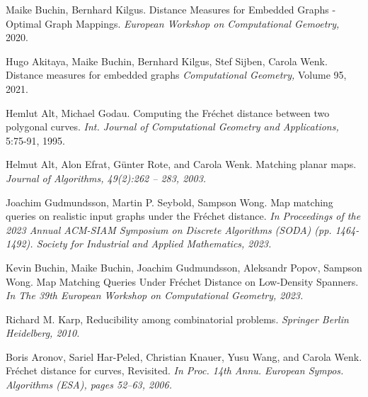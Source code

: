 \documentclass[a4paper, 12pt, twoside]{article}
\theoremstyle{Format1} %
\begin{document}
\begin{thebibliography}{3}
		Maike Buchin, Bernhard Kilgus. Distance Measures for Embedded Graphs - Optimal Graph Mappings.
		\textit{European Workshop on Computational Gemoetry,} 2020.

		Hugo Akitaya, Maike Buchin, Bernhard Kilgus, Stef Sijben, Carola Wenk. Distance measures for embedded graphs
		\textit{Computational Geometry,} Volume 95, 2021.

		Hemlut Alt, Michael Godau. Computing the Fréchet distance between two polygonal curves.
		\textit{Int. Journal of Computational Geometry and Applications,} 5:75-91, 1995.

		Helmut Alt, Alon Efrat, Günter Rote, and Carola Wenk. Matching planar maps.
		\textit{Journal of Algorithms, 49(2):262 – 283, 2003.}

		Joachim Gudmundsson, Martin P. Seybold, Sampson Wong. Map matching queries on realistic input graphs under the Fréchet distance.
		\textit{In Proceedings of the 2023 Annual ACM-SIAM Symposium on Discrete Algorithms (SODA) (pp. 1464-1492). Society for Industrial and Applied Mathematics, 2023.}

		Kevin Buchin, Maike Buchin, Joachim Gudmundsson, Aleksandr Popov, Sampson Wong. Map Matching Queries Under Fréchet Distance on Low-Density Spanners.
		\textit{In The 39th European Workshop on Computational Geometry, 2023.}

		Richard M. Karp, Reducibility among combinatorial problems.
		\textit{Springer Berlin Heidelberg, 2010.}

		Boris Aronov, Sariel Har-Peled, Christian Knauer, Yusu Wang, and Carola Wenk. Fréchet distance for curves, Revisited.
		\textit{In Proc. 14th Annu. European Sympos. Algorithms (ESA), pages 52–63, 2006.}

\end{thebibliography}


\end{document}

